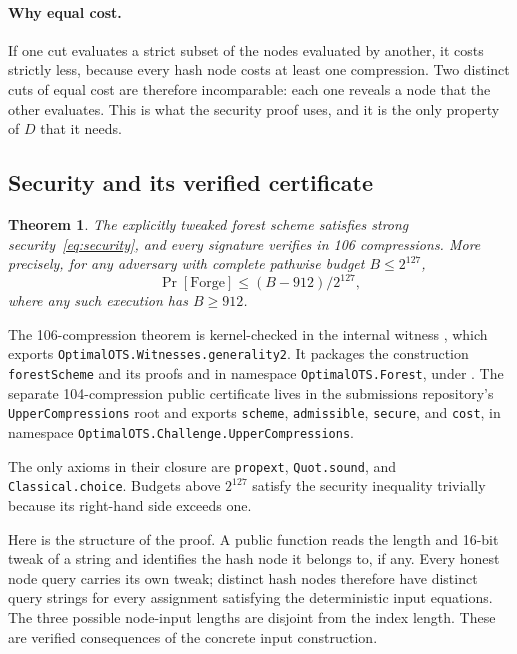 \documentclass[10pt]{article}
\newtheorem{theorem}{Theorem}
\begin{document}
\paragraph{Why equal cost.}
If one cut evaluates a strict subset of the nodes evaluated by another, it costs strictly less, because every hash node costs at least one compression. Two distinct cuts of equal cost are therefore incomparable: each one reveals a node that the other evaluates. This is what the security proof uses, and it is the only property of $D$ that it needs.

\subsection{Security and its verified certificate}\label{sec:formal}

\begin{theorem}\label{thm:scheme}
The explicitly tweaked forest scheme satisfies strong security~\eqref{eq:security}, and every signature verifies in 106 compressions. More precisely, for any adversary with complete pathwise budget $B\le2^{127}$,
\[
\Pr[\mathrm{Forge}]\le(B-912)/2^{127},
\]
where any such execution has $B\ge912$.
\end{theorem}

The 106-compression theorem is kernel-checked in the internal witness , which exports \texttt{OptimalOTS.}\allowbreak\texttt{Witnesses.generality2}. It packages the construction \texttt{forestScheme} and its proofs  and  in namespace \texttt{OptimalOTS.Forest}, under . The separate 104-compression public certificate lives in the submissions repository's \texttt{UpperCompressions} root and exports \texttt{scheme}, \texttt{admissible}, \texttt{secure}, and \texttt{cost}, in namespace \texttt{OptimalOTS.}\allowbreak\texttt{Challenge.UpperCompressions}.

The only axioms in their closure are \texttt{propext}, \texttt{Quot.sound}, and \texttt{Classical.choice}. Budgets above $2^{127}$ satisfy the security inequality trivially because its right-hand side exceeds one.

Here is the structure of the proof. A public function reads the length and 16-bit tweak of a string and identifies the hash node it belongs to, if any. Every honest node query carries its own tweak; distinct hash nodes therefore have distinct query strings for every assignment satisfying the deterministic input equations. The three possible node-input lengths are disjoint from the index length. These are verified consequences of the concrete input construction.
\end{document}

